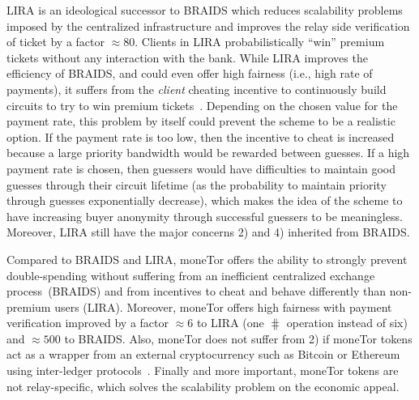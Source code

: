 LIRA is an ideological successor
to BRAIDS which reduces scalability problems imposed by the centralized
infrastructure and improves the relay side verification of ticket by a factor $\approx 80$. Clients in LIRA probabilistically ``win'' premium tickets
without any interaction with the bank. While LIRA improves the efficiency of
BRAIDS, and could even offer high fairness (i.e., high rate of payments), it suffers 
from the \textit{client} cheating incentive to continuously build circuits to try to 
win premium tickets~\cite{jansen2013lira, jansenblogpost}. Depending on the chosen 
value for the payment rate, this problem by itself could prevent the scheme to be a 
realistic option. If the payment rate 
is too low, then the incentive to cheat is increased because a large priority bandwidth would be rewarded between guesses. If a high payment rate is 
chosen, then guessers would have difficulties to maintain good guesses through their 
circuit lifetime (as the probability to maintain priority through guesses exponentially decrease), which makes the idea of the scheme to have increasing buyer anonymity through successful guessers to be meaningless. Moreover, LIRA still have the major concerns 2) and 4) inherited from BRAIDS.

Compared to BRAIDS and LIRA, moneTor offers the ability to strongly prevent double-spending without suffering from an inefficient centralized exchange process~\cite{jansenblogpost}(BRAIDS) and from incentives to cheat and behave differently than non-premium users (LIRA). Moreover, moneTor offers high fairness with payment verification improved by a factor $\approx 6$ to LIRA (one $\hash$ operation instead of six) and $\approx 500$ to BRAIDS. Also, moneTor does not suffer from 2) if moneTor tokens act as a wrapper from an external cryptocurrency such as Bitcoin or Ethereum using inter-ledger protocols~\cite{back2014enabling, poon2017plasma}. Finally and more important, moneTor tokens are not relay-specific, which solves the scalability problem on the economic appeal.


